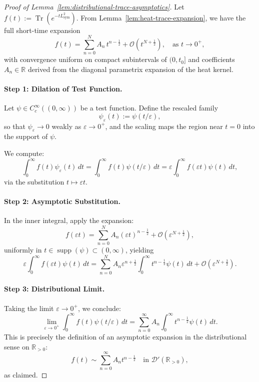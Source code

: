 \begin{proof}[Proof of Lemma~\ref{lem:distributional-trace-asymptotics}]
Let \( f(t) := \operatorname{Tr}(e^{-t L_{\mathrm{sym}}^2}) \). From Lemma~\ref{lem:heat-trace-expansion}, we have the full short-time expansion
\[
f(t) = \sum_{n=0}^N A_n \, t^{n - \frac{1}{2}} + \mathcal{O}(t^{N + \frac{1}{2}}), \quad \text{as } t \to 0^+,
\]
with convergence uniform on compact subintervals of \( (0, t_0] \) and coefficients \( A_n \in \mathbb{R} \) derived from the diagonal parametrix expansion of the heat kernel.

\paragraph{Step 1: Dilation of Test Function.}
Let \( \psi \in C_c^\infty((0, \infty)) \) be a test function. Define the rescaled family
\[
\psi_\varepsilon(t) := \psi(t/\varepsilon),
\]
so that \( \psi_\varepsilon \to 0 \) weakly as \( \varepsilon \to 0^+ \), and the scaling maps the region near \( t = 0 \) into the support of \( \psi \).

We compute:
\[
\int_0^\infty f(t) \psi_\varepsilon(t)\, dt
= \int_0^\infty f(t) \psi(t/\varepsilon)\, dt
= \varepsilon \int_0^\infty f(\varepsilon t) \psi(t)\, dt,
\]
via the substitution \( t \mapsto \varepsilon t \).

\paragraph{Step 2: Asymptotic Substitution.}
In the inner integral, apply the expansion:
\[
f(\varepsilon t) = \sum_{n=0}^N A_n (\varepsilon t)^{n - \frac{1}{2}} + \mathcal{O}(\varepsilon^{N + \frac{1}{2}}),
\]
uniformly in \( t \in \operatorname{supp}(\psi) \subset (0, \infty) \), yielding
\[
\varepsilon \int_0^\infty f(\varepsilon t) \psi(t)\, dt
= \sum_{n=0}^N A_n \varepsilon^{n + \frac{1}{2}} \int_0^\infty t^{n - \frac{1}{2}} \psi(t)\, dt + \mathcal{O}(\varepsilon^{N + \frac{3}{2}}).
\]

\paragraph{Step 3: Distributional Limit.}
Taking the limit \( \varepsilon \to 0^+ \), we conclude:
\[
\lim_{\varepsilon \to 0^+} \int_0^\infty f(t) \psi(t/\varepsilon)\, dt
= \sum_{n=0}^\infty A_n \int_0^\infty t^{n - \frac{1}{2}} \psi(t)\, dt.
\]
This is precisely the definition of an asymptotic expansion in the distributional sense on \( \mathbb{R}_{>0} \):
\[
f(t) \sim \sum_{n=0}^\infty A_n t^{n - \frac{1}{2}} \quad \text{in } \mathcal{D}'(\mathbb{R}_{>0}),
\]
as claimed.
\end{proof}

